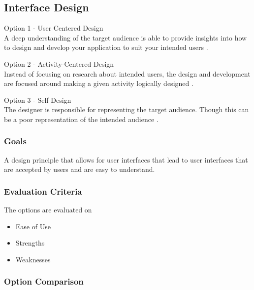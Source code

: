 \documentclass[onecolumn, draftclsnofoot,10pt, compsoc]{IEEEtran}
\begin{document}
{\newpage
\subsection{Interface Design}
\noindent Option 1 - User Centered Design \\
\noindent A deep understanding of the target audience is able to provide insights into how to design and develop your application to suit your intended users \cite{Usability}.

\medskip

\noindent Option 2 - Activity-Centered Design  \\
\noindent Instead of focusing on research about intended users, the design and development are focused around making a given activity logically designed \cite{AListApart}.

\medskip

\noindent Option 3 - Self Design \\
\noindent The designer is responsible for representing the target audience. Though this can be a poor representation of the intended audience \cite{AListApart}.

\medskip

\subsubsection{Goals}
\noindent A design principle that allows for user interfaces that lead to user interfaces that are accepted by users and are easy to understand.

\medskip

\subsubsection{Evaluation Criteria}
\noindent The options are evaluated on
\begin{itemize}
\item Ease of Use
\item Strengths
\item Weaknesses
\end{itemize}

\newpage
\subsubsection{Option Comparison} ~\\

}
\end{document}
